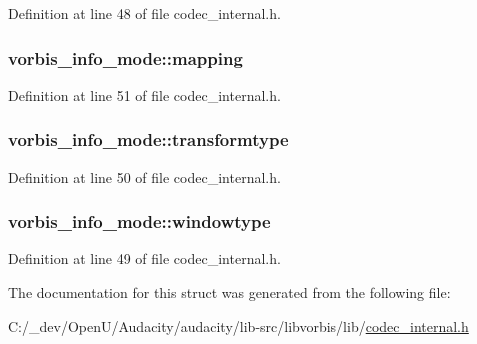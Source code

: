 Definition at line 48 of file codec\+\_\+internal.\+h.

\subsubsection[{\texorpdfstring{mapping}{mapping}}]{ vorbis\+\_\+info\+\_\+mode\+::mapping}\hypertarget{structvorbis__info__mode_a902c7f0a9aef3856261a62797d504fff}{}\label{structvorbis__info__mode_a902c7f0a9aef3856261a62797d504fff}


Definition at line 51 of file codec\+\_\+internal.\+h.

\subsubsection[{\texorpdfstring{transformtype}{transformtype}}]{ vorbis\+\_\+info\+\_\+mode\+::transformtype}\hypertarget{structvorbis__info__mode_a2f9fcbf43679f83f8fc9a5c6ade085ef}{}\label{structvorbis__info__mode_a2f9fcbf43679f83f8fc9a5c6ade085ef}


Definition at line 50 of file codec\+\_\+internal.\+h.

\subsubsection[{\texorpdfstring{windowtype}{windowtype}}]{ vorbis\+\_\+info\+\_\+mode\+::windowtype}\hypertarget{structvorbis__info__mode_a32132c50e4b3e8c4c0715894f8380502}{}\label{structvorbis__info__mode_a32132c50e4b3e8c4c0715894f8380502}


Definition at line 49 of file codec\+\_\+internal.\+h.



The documentation for this struct was generated from the following file\+:\begin{DoxyCompactItemize}
\item 
C\+:/\+\_\+dev/\+Open\+U/\+Audacity/audacity/lib-\/src/libvorbis/lib/\hyperlink{codec__internal_8h}{codec\+\_\+internal.\+h}\end{DoxyCompactItemize}
